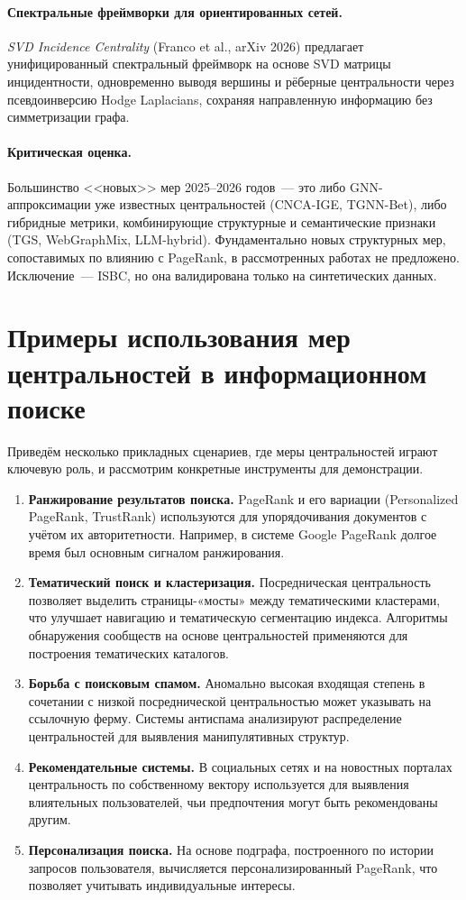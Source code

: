 \documentclass[12pt, a4paper]{article}
\begin{document}
\paragraph{Спектральные фреймворки для ориентированных сетей.}
\emph{SVD Incidence Centrality} (Franco et al., arXiv 2026) предлагает унифицированный спектральный фреймворк на основе SVD матрицы инцидентности, одновременно выводя вершины и рёберные центральности через псевдоинверсию Hodge Laplacians, сохраняя направленную информацию без симметризации графа.

\paragraph{Критическая оценка.}
Большинство <<новых>> мер 2025--2026 годов~--- это либо GNN-аппроксимации уже известных центральностей (CNCA-IGE, TGNN-Bet), либо гибридные метрики, комбинирующие структурные и семантические признаки (TGS, WebGraphMix, LLM-hybrid). Фундаментально новых структурных мер, сопоставимых по влиянию с PageRank, в рассмотренных работах не предложено. Исключение~--- ISBC, но она валидирована только на синтетических данных.
        \section{Примеры использования мер центральностей в информационном поиске}
        
Приведём несколько прикладных сценариев, где меры центральностей играют ключевую роль, и рассмотрим конкретные инструменты для демонстрации.

\begin{enumerate}
\item \textbf{Ранжирование результатов поиска.} PageRank и его вариации (Personalized PageRank, TrustRank) используются для упорядочивания документов с учётом их авторитетности. Например, в системе Google PageRank долгое время был основным сигналом ранжирования.
\item \textbf{Тематический поиск и кластеризация.} Посредническая центральность позволяет выделить страницы-«мосты» между тематическими кластерами, что улучшает навигацию и тематическую сегментацию индекса. Алгоритмы обнаружения сообществ на основе центральностей применяются для построения тематических каталогов.
\item \textbf{Борьба с поисковым спамом.} Аномально высокая входящая степень в сочетании с низкой посреднической центральностью может указывать на ссылочную ферму. Системы антиспама анализируют распределение центральностей для выявления манипулятивных структур.
\item \textbf{Рекомендательные системы.} В социальных сетях и на новостных порталах центральность по собственному вектору используется для выявления влиятельных пользователей, чьи предпочтения могут быть рекомендованы другим.
\item \textbf{Персонализация поиска.} На основе подграфа, построенного по истории запросов пользователя, вычисляется персонализированный PageRank, что позволяет учитывать индивидуальные интересы.
\end{enumerate}
\end{document}
